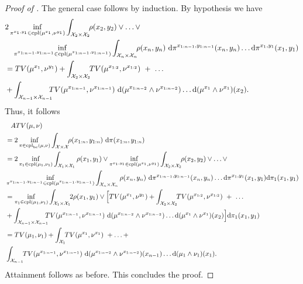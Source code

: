 \documentclass[10pt, A4paper]{amsart}
\theoremstyle{definition}
\newcommand{\X}{\mathcal X}
\newcommand{\cpl}{\mathrm{cpl}}
\newcommand{\cplbc}{\cpl_{\mathrm{bc}}}
\numberwithin{equation}{section}
\begin{document}
\begin{proof}[Proof of ]
    The general case follows by induction. By  hypothesis we have
    \begin{align*}
        & 2 \inf_{\pi^{x_1,y_1} \in \cpl(\mu^{x_1},\nu^{y_1})} \int_{\X_2 \times \X_2} \!\! \rho(x_2,y_2)  \vee  \ldots  \vee \\ 
        &\quad \inf_{\pi^{x_{1:n-1},y_{1:n-1}} \in \cpl(\mu^{x_{1:n-1},y_{1:n-1}})} \int_{\X_n \times \X_n} \!\! \rho(x_n,y_n) \ \mathrm{d} \pi^{x_{1:n-1},y_{1:n-1}} (x_n,y_n) \ldots \mathrm{d}\pi^{x_1,y_1}(x_1,y_1) \notag \\
        & = TV(\mu^{x_1},\nu^{y_1}) + \int_{\X_2 \times \X_2} \!\! TV(\mu^{x_{1:2}}, \nu^{x_{1:2}}) \ + \ \ldots \ \\ 
        & + \int_{\X_{n-1}\times \X_{n-1}} \!\!\!\! TV(\mu^{x_{1:n-1}}, \nu^{x_{1:n-1}}) \ \mathrm{d}(\mu^{x_{1:n-2}} \wedge \nu^{x_{1:n-2}}) \ldots \mathrm{d}(\mu^{x_1} \wedge \nu^{x_1})(x_2). \notag
    \end{align*}
    Thus, it follows
    \begin{align*}
        & \phantom{=} ATV(\mu,\nu) \\
        & = 2 \inf_{\pi \in \cplbc(\mu,\nu)} \int_{\X \times \X} \!\! \rho(x_{1:n},y_{1:n}) \ \mathrm{d} \pi(x_{1:n},y_{1:n}) \\
        & = 2 \inf_{\pi_1 \in \cpl(\mu_1, \nu_1)} \int_{\X_1 \times \X_1} \rho(x_1,y_1) \vee \inf_{\pi^{x_1,y_1} \in \cpl(\mu^{x_1},\nu^{y_1})} \int_{\X_2 \times \X_2} \!\! \rho(x_2,y_2) \vee \ldots \vee \\ 
        & \inf_{\pi^{x_{1:n-1},y_{1:n-1}} \in \cpl(\mu^{x_{1:n-1},y_{1:n-1}})} \int_{\X_n \times \X_n} \rho(x_n,y_n) \ \mathrm{d} \pi^{x_{1:n-1},y_{1:n-1}} (x_n,y_n) \ldots \mathrm{d}\pi^{x_1,y_1}(x_1,y_1) \mathrm{d}\pi_1(x_1,y_1) \notag \\ %
        & = \inf_{\pi_1 \in \cpl(\mu_1, \nu_1)} \int_{\X_1 \times \X_1} \!\! 2\rho(x_1,y_1) \vee  \Big[ TV(\mu^{x_1},\nu^{y_1}) + \int_{\X_2 \times \X_2} \!\! TV(\mu^{x_{1:2}}, \nu^{x_{1:2}}) \ + \ \ldots \ \\ 
        & + \int_{\X_{n-1}\times \X_{n-1}} \!\!\!\! TV(\mu^{x_{1:n-1}}, \nu^{x_{1:n-1}}) \ \mathrm{d}(\mu^{x_{1:n-2}} \wedge \nu^{x_{1:n-2}}) \ldots \mathrm{d}(\mu^{x_1} \wedge \nu^{x_1})(x_2) \Big] \mathrm{d}   \pi_1(x_1,y_1) \notag \\
        & = TV(\mu_1,\nu_1) + \int_{\X_1} \!\! TV(\mu^{x_1}, \nu^{x_1}) \ + \ldots + \\
        & \int_{\X_{n-1}} \!\! TV(\mu^{x_{1:n-1}},\nu^{x_{1:n-1}}) \ \mathrm{d}(\mu^{x_{1:n-2}} \wedge \nu^{x_{1:n-2}})(x_{n-1}) \ldots \mathrm{d}(\mu_1 \wedge \nu_1)(x_1). \notag %
    \end{align*}
    Attainment follows as before.    This concludes the proof.
\end{proof}
\end{document}
